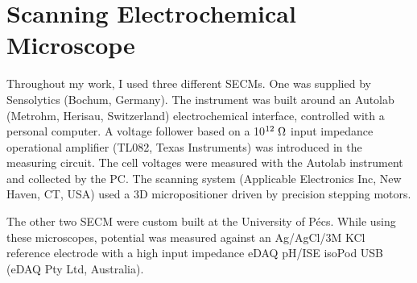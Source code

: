 	\section{Scanning Electrochemical Microscope}
Throughout my work, I used three different SECMs.
One was supplied by Sensolytics (Bochum, Germany).
The instrument was built around an Autolab (Metrohm, Herisau, Switzerland) electrochemical interface, controlled with a personal computer.
A voltage follower based on a 10$^{12}\; \ohm$ input impedance operational amplifier (TL082, Texas Instruments) was introduced in the measuring circuit.
The cell voltages were measured with the Autolab instrument and collected by the PC.
The scanning system (Applicable Electronics Inc, New Haven, CT, USA) used a 3D micropositioner driven by precision stepping motors.

The other two SECM were custom built at the University of Pécs.
While using these microscopes, potential was measured against an Ag/AgCl/3M KCl reference electrode with a high input impedance eDAQ pH/ISE isoPod USB (eDAQ Pty Ltd, Australia).

